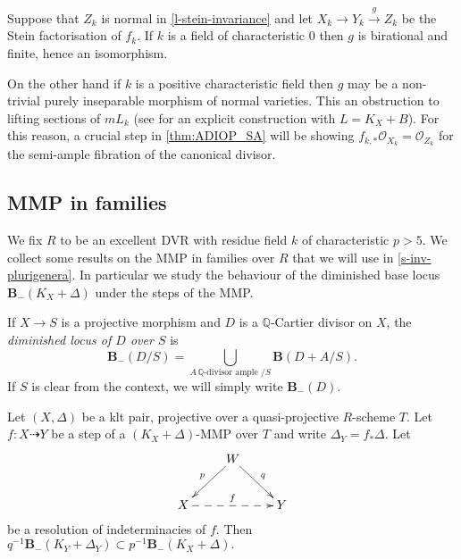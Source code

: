 	\begin{remark}\label{r-connected fibers v contraction}
	Suppose that $Z_{k}$ is normal in \autoref{l-stein-invariance} and let $X_{k}\to Y_{k} \xrightarrow{g} Z_{k}$ be the Stein factorisation of $f_{k}$. If $k$ is a field of characteristic $0$ then $g$ is birational and finite, hence an isomorphism.
	
	On the other hand if $k$ is a positive characteristic field then $g$ may be a non-trivial purely inseparable morphism of normal varieties. This an obstruction to lifting sections of $mL_k$ (see \cite{Bri20} for an explicit construction with $L=K_X+B$). For this reason, a crucial step in \autoref{thm:ADIOP_SA} will be showing $f_{k,*} \mathcal{O}_{X_k}=\mathcal{O}_{Z_k}$ for the semi-ample fibration of the canonical divisor.
	\end{remark}
	
		
	\subsection{MMP in families}

	We fix $R$ to be an excellent DVR with residue field $k$ of characteristic $p>5$.
	We collect some results on the MMP in families over $R$ that we will use in \autoref{s-inv-plurigenera}. In particular we study the behaviour of the diminished base locus $\mathbf{B}_{-}(K_X+\Delta)$ under the steps of the MMP.
	
	\begin{definition}
	If $X \to S$ is a projective morphism and $D$ is a $\mathbb{Q}$-Cartier divisor on $X$, the \emph{diminished locus of $D$ over $S$}  is  $$\mathbf{B}_{-}(D/S) = \bigcup_{A \, \mathbb{Q}\text{-divisor} \text{ ample }/S} \mathbf{B}(D+A/S).$$
	If $S$ is clear from the context, we will simply write $\mathbf{B}_{-}(D)$.
	\end{definition}

	\begin{lemma}\label{l-stable-base-loci}
	Let $(X,\Delta)$ be a klt pair, projective over a quasi-projective $R$-scheme $T$.
	Let $f\colon X \dashrightarrow Y$ be a step of a  $(K_X+\Delta)$-MMP over $T$ and write $\Delta_Y=f_*\Delta$.
	Let
	\begin{equation*}
	\xymatrix{
		& W \ar[dr]^q \ar[dl]_p & \\
		X \ar@{-->}[rr]^{f} & & Y}
	\end{equation*} 
	be a resolution of indeterminacies of $f$.
	Then $q^{-1}\mathbf{B}_{-}(K_Y+\Delta_Y) \subset p^{-1}\mathbf{B}_{-}(K_X+\Delta).$
\end{lemma}


